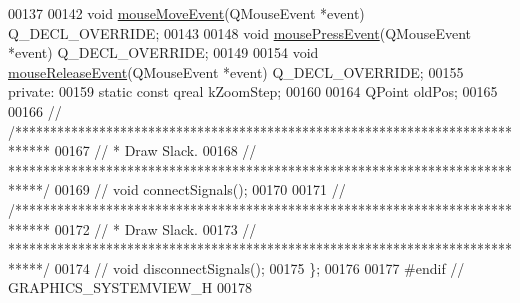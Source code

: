 \begin{DoxyCode}
00137 
00142   \textcolor{keywordtype}{void} \hyperlink{group___graphics_gab19e233cd697852dd71140971cb6e122}{mouseMoveEvent}(QMouseEvent *event) Q\_DECL\_OVERRIDE;
00143 
00148   \textcolor{keywordtype}{void} \hyperlink{group___graphics_ga42d4a485d6d9bd891d9505a5213cf783}{mousePressEvent}(QMouseEvent *event) Q\_DECL\_OVERRIDE;
00149 
00154   \textcolor{keywordtype}{void} \hyperlink{group___graphics_gaa8a2664405194bbe29daa454aead7416}{mouseReleaseEvent}(QMouseEvent *event) Q\_DECL\_OVERRIDE;
00155 \textcolor{keyword}{private}:
00159   \textcolor{keyword}{static} \textcolor{keyword}{const} qreal kZoomStep;
00160 
00164   QPoint oldPos;
00165 
00166 \textcolor{comment}{//  /*****************************************************************************}
00167 \textcolor{comment}{//  * Draw Slack.}
00168 \textcolor{comment}{//  *****************************************************************************/}
00169 \textcolor{comment}{//  void connectSignals();}
00170 
00171 \textcolor{comment}{//  /*****************************************************************************}
00172 \textcolor{comment}{//  * Draw Slack.}
00173 \textcolor{comment}{//  *****************************************************************************/}
00174 \textcolor{comment}{//  void disconnectSignals();}
00175 \};
00176 
00177 \textcolor{preprocessor}{#endif  // GRAPHICS\_SYSTEMVIEW\_H}
00178 
\end{DoxyCode}
